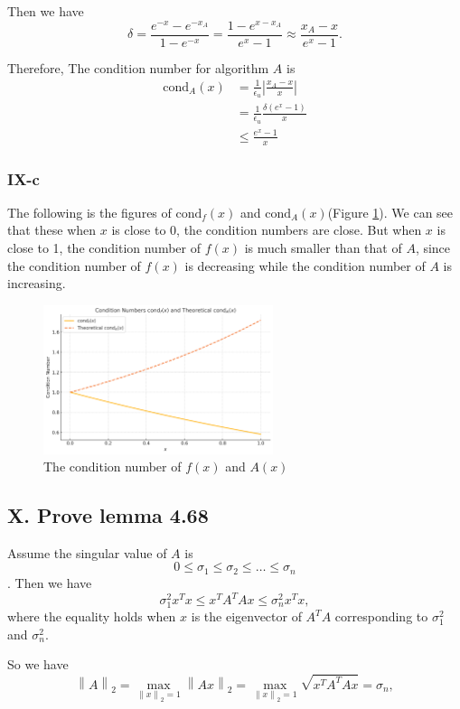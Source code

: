 \documentclass[a4paper]{article}
\newcommand{\abs}[1]{\left|#1\right|}
\newcommand{\normtwo}[1]{\left\|#1\right\|_2}
\begin{document}
Then we have \[
\delta = \frac{e^{-x} - e^{-x_A}}{1-e^{-x}} = \frac{1 - e^{x-x_A}}{e^{x} - 1} \approx \frac{x_A - x}{e^x - 1}.\]

Therefore, The condition number for algorithm $A$ is \begin{align*}
  \text{cond}_A(x) &= \frac{1}{\epsilon_u}\abs{\frac{x_A-x}{x}}\\
&= \frac{1}{\epsilon_u}\frac{\delta(e^x-1)}{x} \\&\leq \frac{e^x-1}{x}
\end{align*}

\subsubsection*{IX-c}
The following is the figures of $\text{cond}_f(x)$ and $\text{cond}_A(x)$(Figure \ref{fig:1}). We can see that these when $x$ is close to 0, the condition numbers are close. But when $x$ is close to 1, the condition number of $f(x)$ is much smaller than that of $A$, since the condition number of $f(x)$ is decreasing while the condition number of $A$ is increasing. 
\begin{figure}[ht]
  \centering
  \includegraphics[width=0.6\textwidth]{1.png}
  \caption{The condition number of $f(x)$ and $A(x)$} 
  \label{fig:1}
\end{figure}

\subsection*{X. Prove lemma 4.68}
Assume the singular value of $A$ is \[0 \leq \sigma_1 \leq \sigma_2 \leq \dots \leq \sigma_n\]. Then we have 
\[\sigma_1^2 x^T x \leq x^TA^TAx\leq \sigma_n^2 x^Tx,\]
where the equality holds when $x$ is the eigenvector of $A^TA$ corresponding to $\sigma_1^2$ and $\sigma_n^2$.

So we have
\[
 \normtwo{A} = \max_{\normtwo{x} = 1} \normtwo{Ax} = \max_{\normtwo{x} = 1} \sqrt{x^TA^TAx} = \sigma_n,
 \]
\end{document}
